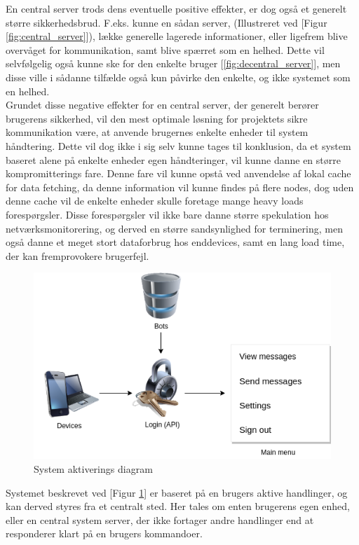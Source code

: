 En central server trods dens eventuelle positive effekter, er dog også et generelt større sikkerhedsbrud. F.eks. kunne en sådan server, (Illustreret ved [Figur \ref{fig:central_server}]), lække generelle lagerede informationer, eller ligefrem blive overvåget for kommunikation, samt blive spærret som en helhed. Dette vil selvfølgelig også kunne ske for den enkelte bruger [\ref{fig:decentral_server}], men disse ville i sådanne tilfælde også kun påvirke den enkelte, og ikke systemet som en helhed.\\
Grundet disse negative effekter for en central server, der generelt berører brugerens sikkerhed, vil den mest optimale løsning for projektets sikre kommunikation være, at anvende brugernes enkelte enheder til system håndtering. Dette vil dog ikke i sig selv kunne tages til konklusion, da et system baseret alene på enkelte enheder egen håndteringer, vil kunne danne en større kompromitterings fare. Denne fare vil kunne opstå ved anvendelse af lokal cache for data fetching, da denne information vil kunne findes på flere nodes, dog uden denne cache vil de enkelte enheder skulle foretage mange heavy loads forespørgsler. Disse forespørgsler vil ikke bare danne større spekulation hos netværksmonitorering, og derved en større sandsynlighed for terminering, men også danne et meget stort dataforbrug hos enddevices, samt en lang load time, der kan fremprovokere brugerfejl.



\begin{figure}[H]
    \centering
    \includegraphics[width=0.75\linewidth]{Projectdoc/Assets/Illustrationer/simple-system.png}
    \caption{System aktiverings diagram}
    \label{fig:sysdiagram}
\end{figure}
Systemet beskrevet ved [Figur \ref{fig:sysdiagram}] er baseret på en brugers aktive handlinger, og kan derved styres fra et centralt sted. Her tales om enten brugerens egen enhed, eller en central system server, der ikke fortager andre handlinger end at responderer klart på en brugers kommandoer.

